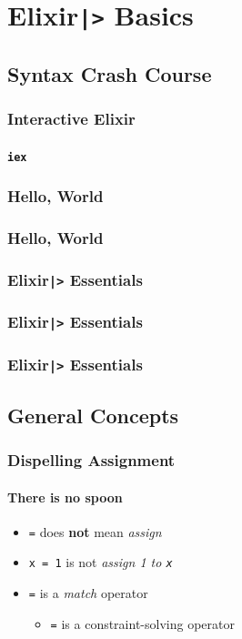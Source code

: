 \documentclass[english]{beamer}
\begin{document}
\section{Elixir\texttt{|>} Basics}

\subsection{Syntax Crash Course}
\begin{frame}[fragile]
\frametitle{Interactive Elixir}
\framesubtitle{\texttt{iex}}

\end{frame}

\begin{frame}[fragile]
\frametitle{Hello, World}

\end{frame}

\begin{frame}[fragile]
\frametitle{Hello, World}

\end{frame}

\begin{frame}[fragile]
\frametitle{Elixir\texttt{|>} Essentials}

\end{frame}

\begin{frame}[fragile]
\frametitle{Elixir\texttt{|>} Essentials}

\end{frame}

\begin{frame}[fragile]
\frametitle{Elixir\texttt{|>} Essentials}

\end{frame}

\subsection{General Concepts}
\begin{frame}
\frametitle{Dispelling Assignment}
\framesubtitle{There is no spoon}
\begin{itemize}
\item{\texttt{=} does \textbf{not} mean \textit{assign}}
\item{\texttt{x = 1} is not \textit{assign 1 to \texttt{x}}}
\item{\texttt{=} is a \textit{match} operator}
\begin{itemize}
\item{\texttt{=} is a constraint-solving operator}
\end{itemize}
\end{itemize}
\end{frame}
\end{document}
